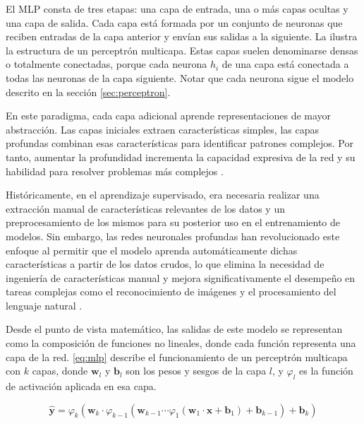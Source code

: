 El MLP consta de tres etapas: una capa de entrada, una o más capas ocultas y una capa de salida. Cada capa está formada por un conjunto de neuronas que reciben entradas de la capa anterior y envían sus salidas a la siguiente. La  ilustra la estructura de un perceptrón multicapa. Estas capas suelen denominarse densas o totalmente conectadas, porque cada neurona $h_i$ de una capa está conectada a todas las neuronas de la capa siguiente. Notar que cada neurona sigue el modelo descrito en la sección \ref{sec:perceptron}.

En este paradigma, cada capa adicional aprende representaciones de mayor abstracción. Las capas iniciales extraen características simples, las capas profundas combinan esas características para identificar patrones complejos. Por tanto, aumentar la profundidad incrementa la capacidad expresiva de la red y su habilidad para resolver problemas más complejos \cite{lecun:hal-04206682}.

Históricamente, en el aprendizaje supervisado, era necesaria realizar una extracción manual de características relevantes de los datos y un preprocesamiento de los mismos para su posterior uso en el entrenamiento de modelos. Sin embargo, las redes neuronales profundas han revolucionado este enfoque al permitir que el modelo aprenda automáticamente dichas características a partir de los datos crudos, lo que elimina la necesidad de ingeniería de características manual y mejora significativamente el desempeño en tareas complejas como el reconocimiento de imágenes y el procesamiento del lenguaje natural \cite{Goodfellow2016}.

% 

Desde el punto de vista matemático, las salidas de este modelo se representan como la composición de funciones no lineales, donde cada función representa una capa de la red. \eqref{eq:mlp} describe el funcionamiento de un perceptrón multicapa con $k$ capas, donde $\mathbf{w}_l$ y $\mathbf{b}_l$ son los pesos y sesgos de la capa $l$, y $\varphi_l$ es la función de activación aplicada en esa capa.

\begin{equation}
    \label{eq:mlp}
    \mathbf{\hat{y}} = \varphi_k\left(\mathbf{w}_k \cdot \varphi_{k-1}\left(\mathbf{w}_{k-1} \cdots \varphi_1\left(\mathbf{w}_1 \cdot \mathbf{x} + \mathbf{b}_1\right) + \mathbf{b}_{k-1}\right) + \mathbf{b}_k\right)
\end{equation}

